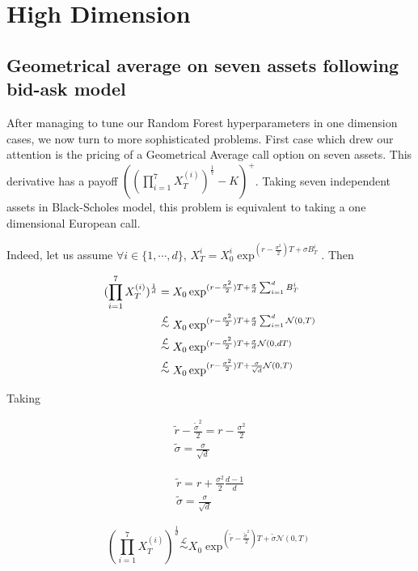 \documentclass[english,11pt,openany]{report}
\theoremstyle{definition}
\theoremstyle{plain}
\theoremstyle{definition}
\begin{document}
\section{High Dimension}

\subsection{Geometrical average on seven assets following bid-ask model}

After managing to tune our Random Forest hyperparameters in one dimension cases, we now turn to more sophisticated problems. 
First case which drew our attention is the pricing of a Geometrical Average call option on seven assets. This derivative has a payoff $((\prod_{i=1}^{7}X_T^{(i)})^{\frac{1}{7}} - K)^+$. 
Taking seven independent assets in Black-Scholes model, this problem is equivalent to taking a one dimensional European call. 

Indeed, let us assume $\forall i \in \{1, \cdots, d\}$, $X_T^{i} = X_0^{i} \exp^{(r - \frac{\sigma^2}{2})T + \sigma B_T^{i}}$. 
Then 

\begin{align}
(\prod_{i=1}^{7}X_T^{(i)})^{\frac{1}{d}} &= X_0 \exp^{(r - \frac{\sigma^2}{2})T + \frac{\sigma}{d}\sum_{i=1}^{d}B_T^{i}} \notag \\
&\overset{\mathcal{L}}{\sim} X_0 \exp^{(r - \frac{\sigma^2}{2})T + \frac{\sigma}{d}\sum_{i=1}^{d}\mathcal{N}(0, T)} \notag \\
&\overset{\mathcal{L}}{\sim} X_0 \exp^{(r - \frac{\sigma^2}{2})T + \frac{\sigma}{d}\mathcal{N}(0, dT)} \notag \\
&\overset{\mathcal{L}}{\sim} X_0 \exp^{(r - \frac{\sigma^2}{2})T + \frac{\sigma}{\sqrt{d}}\mathcal{N}(0, T)} \notag
\end{align}

Taking 

\begin{align}
 \tilde{r} - \frac{\tilde{\sigma}^2}{2} = r - \frac{\sigma^2}{2} \\
\tilde{\sigma} = \frac{\sigma}{\sqrt{d}}
\end{align}

\begin{align}
\tilde{r} = r + \frac{\sigma^2}{2}\frac{d-1}{d} \\
\tilde{\sigma} = \frac{\sigma}{\sqrt{d}}
\end{align}

\begin{displaymath}
(\prod_{i=1}^{7}X_T^{(i)})^{\frac{1}{d}} \overset{\mathcal{L}}{\sim} X_0 \exp^{(\tilde{r} - \frac{\tilde{\sigma}^2}{2})T + \tilde{\sigma}\mathcal{N}(0, T)}
\end{displaymath}
\end{document}
